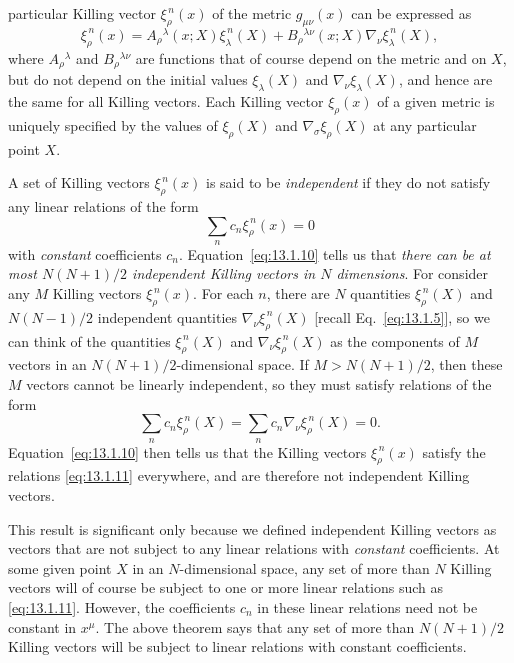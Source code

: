 particular Killing vector \(\xi_\rho^{\,n}(x)\) of the metric
\(g_{\mu\nu}(x)\) can be expressed as
\begin{equation}
  \xi_\rho^{\,n}(x)
  =
  A_\rho{}^\lambda(x;X)\xi_\lambda^{\,n}(X)
  +B_\rho{}^{\lambda\nu}(x;X)
  \nabla_\nu\xi_\lambda^{\,n}(X),
  \tag{13.1.10}\label{eq:13.1.10}
\end{equation}
where \(A_\rho{}^\lambda\) and \(B_\rho{}^{\lambda\nu}\) are functions
that of course depend on the metric and on \(X\), but do not depend on the
initial values \(\xi_\lambda(X)\) and \(\nabla_\nu\xi_\lambda(X)\), and
hence are the same for all Killing vectors. Each Killing vector
\(\xi_\rho(x)\) of a given metric is uniquely specified by the values of
\(\xi_\rho(X)\) and \(\nabla_\sigma\xi_\rho(X)\) at any particular point
\(X\).

A set of Killing vectors \(\xi_\rho^{\,n}(x)\) is said to be
\emph{independent} if they do not satisfy any linear relations of the form
\begin{equation}
  \sum_n c_n\xi_\rho^{\,n}(x)=0
  \tag{13.1.11}\label{eq:13.1.11}
\end{equation}
with \emph{constant} coefficients \(c_n\). Equation~\eqref{eq:13.1.10}
tells us that \emph{there can be at most \(N(N+1)/2\) independent Killing
vectors in \(N\) dimensions}. For consider any \(M\) Killing vectors
\(\xi_\rho^{\,n}(x)\). For each \(n\), there are \(N\) quantities
\(\xi_\rho^{\,n}(X)\) and \(N(N-1)/2\) independent quantities
\(\nabla_\nu\xi_\rho^{\,n}(X)\) [recall Eq.~\eqref{eq:13.1.5}], so we can
think of the quantities \(\xi_\rho^{\,n}(X)\) and
\(\nabla_\nu\xi_\rho^{\,n}(X)\) as the components of \(M\) vectors in an
\(N(N+1)/2\)-dimensional space. If \(M>N(N+1)/2\), then these \(M\)
vectors cannot be linearly independent, so they must satisfy relations of
the form
\[
  \sum_n c_n\xi_\rho^{\,n}(X)
  =
  \sum_n c_n\nabla_\nu\xi_\rho^{\,n}(X)
  =0.
\]
Equation~\eqref{eq:13.1.10} then tells us that the Killing vectors
\(\xi_\rho^{\,n}(x)\) satisfy the relations \eqref{eq:13.1.11}
everywhere, and are therefore not independent Killing vectors.

This result is significant only because we defined independent Killing
vectors as vectors that are not subject to any linear relations with
\emph{constant} coefficients. At some given point \(X\) in an
\(N\)-dimensional space, any set of more than \(N\) Killing vectors will of
course be subject to one or more linear relations such as
\eqref{eq:13.1.11}. However, the coefficients \(c_n\) in these linear
relations need not be constant in \(x^\mu\). The above theorem says that any
set of more than \(N(N+1)/2\) Killing vectors will be subject to linear
relations with constant coefficients.

